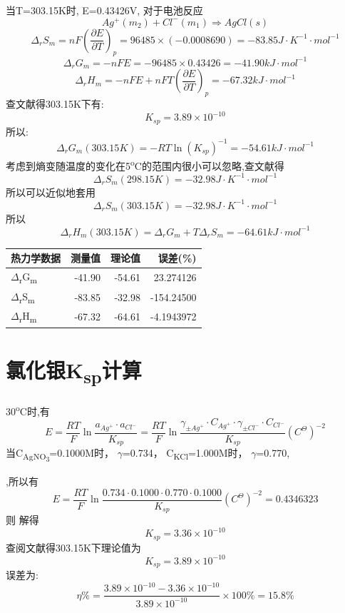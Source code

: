 \documentclass[11pt]{report}
\begin{document}
当T=303.15K时, E=0.43426V,
对于电池反应
\[
Ag^{+}(m_{2})+Cl^{-}(m_{1})\Longrightarrow AgCl(s)
\]
\[
\Delta_{r}S_{m}=nF\left(\frac{\partial E}{\partial T}\right)_{p}=96485\times (-0.0008690)= -83.85J\cdot K^{-1}\cdot mol^{-1}
\]
\[
\Delta_{r}G_{m}=-nFE=-96485\times 0.43426 =-41.90kJ\cdot mol^{-1}
\]
\[
\Delta_{r}H_{m}=-nFE+nFT\left(\frac{\partial E}{\partial T}\right)_{p}=-67.32kJ\cdot mol^{-1}
\]
查文献得303.15K下有:
\[
K_{sp}=3.89\times 10^{-10}
\]
所以:
\[
\Delta_{r}G_{m}(303.15K)=-RT\ln (K_{sp})^{-1}=-54.61kJ\cdot mol^{-1}
\]
考虑到熵变随温度的变化在5\textsuperscript{o}C的范围内很小可以忽略,查文献得
\[
\Delta_{r}S_{m}(298.15K)=-32.98J\cdot K^{-1} \cdot mol^{-1}
\]
所以可以近似地套用
\[
\Delta_{r}S_{m}(303.15K)=-32.98J\cdot K^{-1} \cdot mol^{-1}
\]
所以
\[
\Delta_{r}H_{m}(303.15K)=\Delta_{r}G_{m}+T\Delta_{r}S_{m}=-64.61kJ\cdot mol^{-1}
\]
\begin{center}
\begin{tabular}{lrrr}
热力学数据 & 测量值 & 理论值 & 误差(\%)\\
\hline
\(\Delta\)\textsubscript{r}G\textsubscript{m} & -41.90 & -54.61 & 23.274126\\
\(\Delta\)\textsubscript{r}S\textsubscript{m} & -83.85 & -32.98 & -154.24500\\
\(\Delta\)\textsubscript{r}H\textsubscript{m} & -67.32 & -64.61 & -4.1943972\\
\end{tabular}
\end{center}
\section{氯化银K\textsubscript{sp}计算}
\label{sec:org1f69346}
30\textsuperscript{o}C时,有
\[
    E=\frac{RT}{F}\ln\frac{a_{Ag^{+}}
    \cdot a_{Cl^{-}}}{K_{sp}}
    =\frac{RT}{F}\ln\frac{\gamma_{\pm Ag^{+}}
    \cdot
    C_{Ag^{+}}\cdot\gamma_{\pm Cl^{-}}\cdot C_{Cl^{-}}}{K_{sp}} (C^{\Theta})^{-2}
    \]
当C\textsubscript{AgNO\textsubscript{3}}=0.1000M时，
\(\gamma\)\textsubscript{\textpm{}}=0.734，
C\textsubscript{KCl}=1.000M时，
\(\gamma\)\textsubscript{\textpm{}}=0.770,

,所以有
\[
    E=\frac{RT}{F}\ln\frac{0.734
    \cdot
    0.1000
    \cdot
    0.770
    \cdot
    0.1000
    }{K_{sp}} (C^{\Theta})^{-2}=0.4346323 
    \]
则
解得
\[
    K_{sp}=3.36\times 10^{-10}
    \]
查阅文献得303.15K下理论值为
\[
    K_{sp}=3.89\times 10^{-10}
    \]
误差为:
\[
    \eta\% = \frac{3.89\times 10^{-10}-3.36\times 10^{-10}}{3.89\times 10^{-10}}\times 100\%= 15.8\%
    \]
\end{document}
